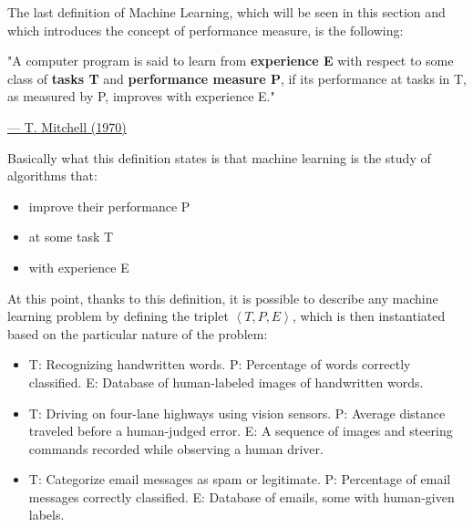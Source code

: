 \newpage

The last definition of Machine Learning, which will be seen in this
section and which introduces the concept of performance measure, is the
following:

\vspace{5mm}

\begin{quoting}
    "A computer program is said to learn from \textbf{experience E} with
    respect to some class of \textbf{tasks T} and \textbf{performance
        measure P}, if its performance at tasks in T, as measured by P,
    improves with experience E."
\end{quoting}

\hspace{310pt}
\href{https://en.wikipedia.org/wiki/Tom_M._Mitchell}{--- \underline{T. Mitchell (1970)}}

\vspace{10mm}

Basically what this definition states is that machine learning is the
study of algorithms that:

\begin{itemize}
    \item improve their performance P
    \item at some task T
    \item with experience E
\end{itemize}

\vspace{5mm}

At this point, thanks to this definition, it is possible to describe any
machine learning problem by defining the triplet
$\left\langle T,P,E\right\rangle$,
which is then instantiated based on the particular
nature of the problem:

\begin{itemize}
    \item
          \begin{example}
              T: Recognizing handwritten words.
              P: Percentage of words correctly classified.
              E: Database of human-labeled images of handwritten words.
          \end{example}
    \item
          \begin{example}
              T: Driving on four-lane highways using vision sensors.
              P: Average distance traveled before a human-judged error.
              E: A sequence of images and steering commands recorded
              while observing a human driver.
          \end{example}
    \item
          \begin{example}
              T: Categorize email messages as spam or legitimate.
              P: Percentage of email messages correctly classified.
              E: Database of emails, some with human-given labels.
          \end{example}
\end{itemize}

